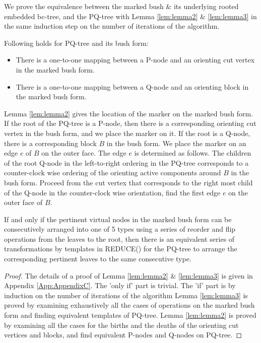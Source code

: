 \documentclass[a4]{jgaa-art}
\begin{document}
We prove the equivalence between the marked bush \& its underlying rooted embedded bc-tree, 
and the PQ-tree with Lemma \ref{lem:lemma2} \& \ref{lem:lemma3} in the same induction step
 on the number of iterations of the algorithm.

\begin{lemma}\label{lem:lemma2}
Following holds for PQ-tree and its bush form:
\begin{itemize}
\item There is a one-to-one mapping between a P-node and an orienting cut vertex in the marked bush form.
\item There is a one-to-one mapping between a Q-node and an orienting block in the marked bush form.
\end{itemize}
\end{lemma}

Lemma \ref{lem:lemma2} gives the location of the marker on the marked bush form. 
If the root of the PQ-tree is a P-node, then there is a corresponding orienting cut vertex in the bush form,
and we place the marker on it.
If the root is a Q-node, there is a corresponding block $B$ in the bush form.
We place the marker on an edge $e$ of $B$ on the outer face.
The edge $e$ is determined as follows.
The children of the root Q-node in the left-to-right ordering in the PQ-tree corresponds
to a counter-clock wise ordering of the orienting active components around $B$ in the bush form.
Proceed from the cut vertex that corresponds to the right most child of the Q-node 
in the counter-clock wise orientation, find the first edge $e$ on the outer face of $B$.

\begin{lemma}\label{lem:lemma3}
   If and only if the pertinent virtual nodes in the marked bush form 
   can be consecutively arranged into one of 5 types
   using a series of reorder and flip operations from the leaves to the root,
   then there is an equivalent series of transformations by templates 
   in REDUCE() for the PQ-tree to arrange the corresponding pertinent
   leaves to the same consecutive type.
\end{lemma}

\begin{proof}
   The details of a proof of Lemma \ref{lem:lemma2} \& \ref{lem:lemma3} is given in Appendix \ref{App:AppendixC}.
   The 'only if' part is trivial. 
   The 'if' part is by induction on the number of iterations of the algorithm 
   Lemma \ref{lem:lemma3} is proved by examining exhaustively
   all the cases of operations on the marked bush form and finding equivalent templates of PQ-tree.
   Lemma \ref{lem:lemma2} is proved by examining all the cases for the births and the deaths of
   the orienting cut vertices and blocks, and find equivalent P-nodes and Q-nodes on PQ-tree. 
\end{proof}
\end{document}

